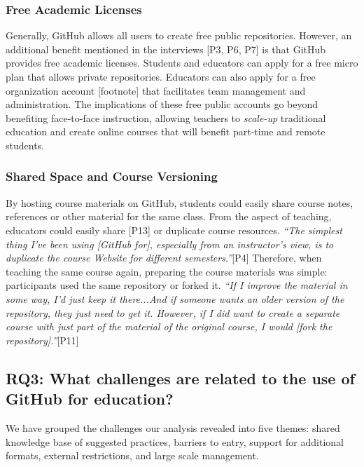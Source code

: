 \subsubsection{Free Academic Licenses}

Generally, GitHub allows all users to create free public repositories. However, an additional benefit mentioned in the interviews [P3, P6, P7] is that GitHub provides free academic licenses. Students and educators can apply for a free micro plan that allows private repositories. Educators can also apply for a free organization account [footnote] that facilitates team management and administration. The implications of these free public accounts go beyond benefiting face-to-face instruction, allowing teachers to \textit{scale-up} traditional education and create online courses that will benefit part-time and remote students.

\subsubsection{Shared Space and Course Versioning}
By hosting course materials on GitHub, students could easily share course notes, references or other material for the same class. From the aspect of teaching, educators could easily share [P13] or duplicate course resources. \textit{``The simplest thing I've been using [GitHub for], especially from an instructor's view, is to duplicate the course Website for different semesters.''}[P4] Therefore, when teaching the same course again, preparing the course materials was simple: participants used the same repository or forked it. \textit{``If I improve the material in some way, I'd just keep it there...And if someone wants an older version of the repository, they just need to get it. However, if I did want to create a separate course with just part of the material of the original course, I would [fork the repository].''}[P11]

\subsection{RQ3: What challenges are related to the use of GitHub for education?}
We have grouped the challenges our analysis revealed into five themes: shared knowledge base of suggested practices, barriers to entry, support for additional formats, external restrictions, and large scale management.

